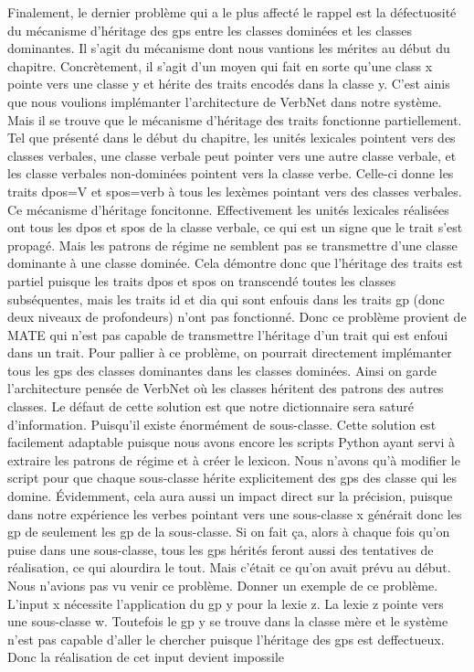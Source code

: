 Finalement, le dernier problème qui a le plus affecté le rappel est la défectuosité du mécanisme d'héritage des gps entre les classes dominées et les classes dominantes. Il s'agit du mécanisme dont nous vantions les mérites au début du chapitre. Concrètement, il s'agit d'un moyen qui fait en sorte qu'une class x pointe vers une classe y et hérite des traits encodés dans la classe y. C'est ainis que nous voulions implémanter l'architecture de VerbNet dans notre système. Mais il se trouve que le mécanisme d'héritage des traits fonctionne partiellement. Tel que présenté dans le début du chapitre, les unités lexicales pointent vers des classes verbales, une classe verbale peut pointer vers une autre classe verbale, et les classe verbales non-dominées pointent vers la classe verbe. Celle-ci donne les traits dpos=V et spos=verb à tous les lexèmes pointant vers des classes verbales. Ce mécanisme d'héritage foncitonne. Effectivement les unités lexicales réalisées ont tous les dpos et spos de la classe verbale, ce qui est un signe que le trait s'est propagé. Mais les patrons de régime ne semblent pas se transmettre d'une classe dominante à une classe dominée. Cela démontre donc que l'héritage des traits est partiel puisque les traits dpos et spos on transcendé toutes les classes subséquentes, mais les traits id et dia qui sont enfouis dans les traits gp (donc deux niveaux de profondeurs) n'ont pas fonctionné. Donc ce problème provient de MATE qui n'est pas capable de transmettre l'héritage d'un trait qui est enfoui dans un trait. Pour pallier à ce problème, on pourrait directement implémanter tous les gps des classes dominantes dans les classes dominées. Ainsi on garde l'architecture pensée de VerbNet où les classes héritent des patrons des autres classes. Le défaut de cette solution est que notre dictionnaire sera saturé d'information. Puisqu'il existe énormément de sous-classe. Cette solution est facilement adaptable puisque nous avons encore les scripts Python ayant servi à extraire les patrons de régime et à créer le lexicon. Nous n'avons qu'à modifier le script pour que chaque sous-classe hérite explicitement des gps des classe qui les domine. Évidemment, cela aura aussi un impact direct sur la précision, puisque dans notre expérience les verbes pointant vers une sous-classe x générait donc les gp de seulement les gp de la sous-classe. Si on fait ça, alors à chaque fois qu'on puise dans une sous-classe, tous les gps hérités feront aussi des tentatives de réalisation, ce qui alourdira le tout. Mais c'était ce qu'on avait prévu au début. Nous n'avions pas vu venir ce problème. Donner un exemple de ce problème. L'input x nécessite l'application du gp y pour la lexie z. La lexie z pointe vers une sous-classe w. Toutefois le gp y se trouve dans la classe mère et le système n'est pas capable d'aller le chercher puisque l'héritage des gps est deffectueux. Donc la réalisation de cet input devient impossile

